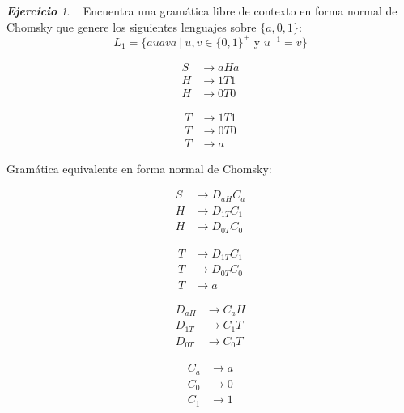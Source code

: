 \documentclass[12pt,spanish]{article}
\theoremstyle{definition}
\theoremstyle{remark}
\newtheorem{exercise}{\textbf{Ejercicio}}%
\begin{document}
\begin{exercise}~ Encuentra una gramática libre de contexto en forma
  normal de Chomsky que genere los siguientes lenguajes sobre
  $\{a,0,1\}$:
  \[L_1=\{auava\ |\ u,v \in \{0,1\}^+ \text{ y } u^{-1}=v\}\]
  \vspace{-15mm}
  \begin{multicols}{3}
    \begin{align*}
      S&\rightarrow aHa \\
      H&\rightarrow 1T1 \\
      H&\rightarrow 0T0    
    \end{align*}

    \columnbreak

    \begin{align*}
      T&\rightarrow 1T1 \\
      T&\rightarrow 0T0 \\
      T&\rightarrow a    
    \end{align*}

    \columnbreak

  \end{multicols}

  Gramática equivalente en forma normal de Chomsky: \vspace{-5mm}
  \begin{multicols}{4}
    \begin{align*}
      S&\rightarrow D_{aH}C_a \\
      H&\rightarrow D_{1T}C_1 \\
      H&\rightarrow D_{0T}C_0    
    \end{align*}

    \columnbreak

    \begin{align*}
      T&\rightarrow D_{1T}C_1 \\
      T&\rightarrow D_{0T}C_0 \\
      T&\rightarrow a    
    \end{align*}

    \columnbreak

    \begin{align*}
       D_{aH}&\rightarrow C_aH \\
      D_{1T}&\rightarrow C_1T \\
      D_{0T}&\rightarrow C_0T    
    \end{align*}

    \begin{align*}
      C_a&\rightarrow a \\
      C_0&\rightarrow 0 \\
      C_1&\rightarrow 1         
    \end{align*}


\end{multicols}
\end{exercise}
\end{document}
